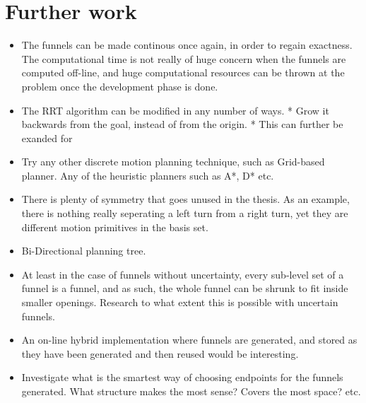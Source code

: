 \chapter{Further work}

\begin{itemize}
  \item The funnels can be made continous once again, in order to regain
    exactness. The computational time is not really of huge concern when the
    funnels are computed off-line, and huge computational resources can be
    thrown at the problem once the development phase is done.
  \item The RRT algorithm can be modified in any number of ways.
    * Grow it backwards from the goal, instead of from the origin.
    * This can further be exanded for 

  \item Try any other discrete motion planning technique, such as Grid-based
    planner. Any of the heuristic planners such as A*, D* etc.

  \item There is plenty of symmetry that goes unused in the thesis. As an
    example, there is nothing really seperating a left turn from a right turn,
    yet they are different motion primitives in the basis set.

  \item Bi-Directional planning tree.

  \item At least in the case of funnels without uncertainty, every sub-level set
    of a funnel is a funnel, and as such, the whole funnel can be shrunk to fit
    inside smaller openings. Research to what extent this is possible with
    uncertain funnels.

  \item An on-line hybrid implementation where funnels are generated, and stored
    as they have been generated and then reused would be interesting.

  \item  Investigate what is the smartest way of choosing endpoints for the
    funnels generated. What structure makes the most sense? Covers the most
    space? etc.
\end{itemize}